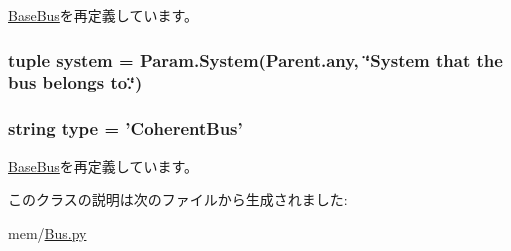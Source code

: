 \hyperlink{classBus_1_1BaseBus_a17da7064bc5c518791f0c891eff05fda}{BaseBus}を再定義しています。\hypertarget{classBus_1_1CoherentBus_ab737471139f5a296e5b26e8a0e1b0744}{
\subsubsection[{system}]{\setlength{\rightskip}{0pt plus 5cm}tuple {\bf system} = Param.System(Parent.any, \char`\"{}System that the bus belongs to.\char`\"{})}}
\label{classBus_1_1CoherentBus_ab737471139f5a296e5b26e8a0e1b0744}
\hypertarget{classBus_1_1CoherentBus_acce15679d830831b0bbe8ebc2a60b2ca}{
\subsubsection[{type}]{\setlength{\rightskip}{0pt plus 5cm}string {\bf type} = '{\bf CoherentBus}'}}
\label{classBus_1_1CoherentBus_acce15679d830831b0bbe8ebc2a60b2ca}


\hyperlink{classBus_1_1BaseBus_acce15679d830831b0bbe8ebc2a60b2ca}{BaseBus}を再定義しています。

このクラスの説明は次のファイルから生成されました:\begin{DoxyCompactItemize}
\item 
mem/\hyperlink{Bus_8py}{Bus.py}\end{DoxyCompactItemize}
